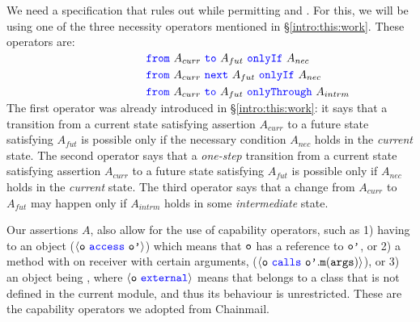 {We need  a specification that rules out \ModB while permitting \ModA and
\ModC.  For this, we will be using  one of the  three necessity operators mentioned in  \S \ref{intro:this:work}. These operators are:}
\\
$ \strut \hspace{1.7in} {\color{blue}\texttt{from}}\ A_{curr}\ {\color{blue}\texttt{to}}\ A_{fut}\ {\color{blue}\texttt{onlyIf}}\ A_{nec} $ \\
$ \strut \hspace{1.7in}   {\color{blue}\texttt{from}}\ A_{curr}\ {\color{blue}\texttt{next}}\ A_{fut}\ {\color{blue}\texttt{onlyIf}}\ A_{nec} $ \\
$ \strut \hspace{1.7in}   {\color{blue}\texttt{from}}\ A_{curr}\ {\color{blue}\texttt{to}}\ A_{fut}\ {\color{blue}\texttt{onlyThrough}}\ A_{intrm} $
\\
The first operator was already introduced in \S \ref{intro:this:work}: it says that  
a  {transition} from a current state satisfying assertion $A_{curr}$ to a future
state satisfying $A_{fut}$  is possible only if  the   necessary 
condition
$A_{nec}$ holds in the \emph{current} state.
%
{The  second operator says    that 
a  \emph{one-step} {transition} from a current state satisfying assertion $A_{curr}$ to a future
state satisfying $A_{fut}$  
is possible only if %
$A_{nec}$ holds in the \emph{current} state.   
The   third operator   says that a change from %
 $A_{curr}$ to  $A_{fut}$  may happen only if %
 $A_{intrm}$ holds in some \emph{intermediate} state.}
 
  
%  

{
Our assertions $A$, also allow for the use of capability operators, such as 
1) having  to an object ($\langle {\texttt{o}}\ {\color{blue}\texttt{access}}\ {\texttt{o'}} \rangle$) which means that ${\texttt{o}}$ has a reference to ${\texttt{o'}}$,
 or 2)  a method with on receiver with certain arguments, 
  ($\langle {\texttt{o}}\ {\color{blue}\texttt{calls}}\ {\texttt{o'}}.{\texttt{m}}({\texttt{args}}) \rangle $), or 3) an object being ,
  where  $\langle {\texttt{o}}\ {\color{blue}\texttt{external}}\rangle$ means that  belongs to a class that is not defined in the current module,
  and thus its behaviour is unrestricted.}
 These are the capability operators we 
adopted from Chainmail.


